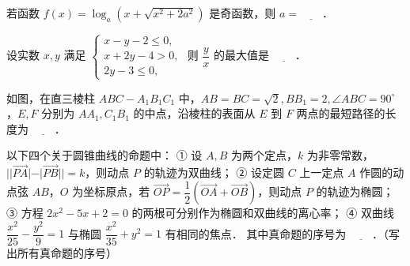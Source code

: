 \begin{question}
若函数 $f(x) = \log_a(x + \sqrt{x^2 + 2a^2})$ 是奇函数，则 $a = \underline{\hspace{2em}}$．

\end{question}
\begin{question}
设实数 $x, y$ 满足 $\begin{cases} x - y - 2 \leqslant 0, \\ x + 2y - 4 > 0, \\ 2y - 3 \leqslant 0, \end{cases}$ 则 $\dfrac{y}{x}$ 的最大值是 $\underline{\hspace{2em}}$．

\Needspace{0.4\textheight}
\end{question}
\begin{question}
如图，在直三棱柱 $ABC - A_1B_1C_1$ 中，$AB = BC = \sqrt{2}, BB_1 = 2, \angle ABC = 90^\circ$，$E, F$ 分别为 $AA_1, C_1B_1$ 的中点，沿棱柱的表面从 $E$ 到 $F$ 两点的最短路径的长度为 $\underline{\hspace{2em}}$．
\nopagebreak[4]
\begin{center}\end{center}
\nopagebreak[4]
\end{question}
\begin{question}
以下四个关于圆锥曲线的命题中：
① 设 $A, B$ 为两个定点，$k$ 为非零常数，$||\vec{PA}| - |\vec{PB}|| = k$，则动点 $P$ 的轨迹为双曲线；
② 设定圆 $C$ 上一定点 $A$ 作圆的动点弦 $AB$，$O$ 为坐标原点，若 $\vec{OP} = \dfrac{1}{2}(\vec{OA} + \vec{OB})$，则动点 $P$ 的轨迹为椭圆；
③ 方程 $2x^2 - 5x + 2 = 0$ 的两根可分别作为椭圆和双曲线的离心率；
④ 双曲线 $\dfrac{x^2}{25} - \dfrac{y^2}{9} = 1$ 与椭圆 $\dfrac{x^2}{35} + y^2 = 1$ 有相同的焦点．
其中真命题的序号为 $\underline{\hspace{2em}}$．（写出所有真命题的序号）

\end{question}

